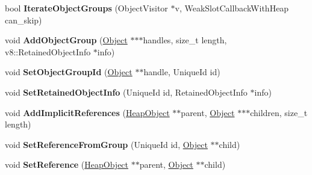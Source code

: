 \begin{DoxyCompactItemize}
\item 
\hypertarget{classv8_1_1internal_1_1_global_handles_a1d1e6e11c5dd6515d8d103856e36fb56}{}bool {\bfseries Iterate\+Object\+Groups} (Object\+Visitor $\ast$v, Weak\+Slot\+Callback\+With\+Heap can\+\_\+skip)\label{classv8_1_1internal_1_1_global_handles_a1d1e6e11c5dd6515d8d103856e36fb56}

\item 
\hypertarget{classv8_1_1internal_1_1_global_handles_a654887a9111563fa2c03c27516ee0526}{}void {\bfseries Add\+Object\+Group} (\hyperlink{classv8_1_1internal_1_1_object}{Object} $\ast$$\ast$$\ast$handles, size\+\_\+t length, v8\+::\+Retained\+Object\+Info $\ast$info)\label{classv8_1_1internal_1_1_global_handles_a654887a9111563fa2c03c27516ee0526}

\item 
\hypertarget{classv8_1_1internal_1_1_global_handles_acb1f05dff3d4cc6b668b4c159b7bf90d}{}void {\bfseries Set\+Object\+Group\+Id} (\hyperlink{classv8_1_1internal_1_1_object}{Object} $\ast$$\ast$handle, Unique\+Id id)\label{classv8_1_1internal_1_1_global_handles_acb1f05dff3d4cc6b668b4c159b7bf90d}

\item 
\hypertarget{classv8_1_1internal_1_1_global_handles_a3c149c9884e5f79fc74be0fbd2014804}{}void {\bfseries Set\+Retained\+Object\+Info} (Unique\+Id id, Retained\+Object\+Info $\ast$info)\label{classv8_1_1internal_1_1_global_handles_a3c149c9884e5f79fc74be0fbd2014804}

\item 
\hypertarget{classv8_1_1internal_1_1_global_handles_a8f7027d9154fa610e8422426e4d5728a}{}void {\bfseries Add\+Implicit\+References} (\hyperlink{classv8_1_1internal_1_1_heap_object}{Heap\+Object} $\ast$$\ast$parent, \hyperlink{classv8_1_1internal_1_1_object}{Object} $\ast$$\ast$$\ast$children, size\+\_\+t length)\label{classv8_1_1internal_1_1_global_handles_a8f7027d9154fa610e8422426e4d5728a}

\item 
\hypertarget{classv8_1_1internal_1_1_global_handles_a93627836fb862ad309bd00220d4d4b65}{}void {\bfseries Set\+Reference\+From\+Group} (Unique\+Id id, \hyperlink{classv8_1_1internal_1_1_object}{Object} $\ast$$\ast$child)\label{classv8_1_1internal_1_1_global_handles_a93627836fb862ad309bd00220d4d4b65}

\item 
\hypertarget{classv8_1_1internal_1_1_global_handles_a59567463377affca1ef633c746ab3b81}{}void {\bfseries Set\+Reference} (\hyperlink{classv8_1_1internal_1_1_heap_object}{Heap\+Object} $\ast$$\ast$parent, \hyperlink{classv8_1_1internal_1_1_object}{Object} $\ast$$\ast$child)\label{classv8_1_1internal_1_1_global_handles_a59567463377affca1ef633c746ab3b81}


\end{DoxyCompactItemize}
